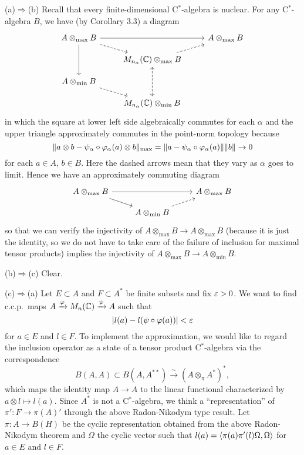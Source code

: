 \documentclass{../../../small}
\begin{document}
\begin{pf}
(a)$\Rightarrow$(b)
Recall that every finite-dimensional C$^*$-algebra is nuclear.
For any C$^*$-algebra $B$, we have (by Corollary 3.3) a diagram
\[\begin{tikzcd}[row sep=10pt]
 A\otimes_{\max} B \ar{rr}\ar[dashed]{rd}\ar{dd} &&  A\otimes_{\max} B\\
&M_{n_\alpha}(\C)\otimes_{\max} B \ar[dashed]{ru}\ar[dashed,leftrightarrow]{dd}&\\
 A\otimes_{\min} B \ar[dashed]{rd} &&\\
&M_{n_\alpha}(\C)\otimes_{\min} B&
\end{tikzcd}\]
in which the square at lower left side algebraically commutes for each $\alpha$ and the upper triangle approximately commutes in the point-norm topology because
\[\|a\otimes b-\psi_\alpha\circ\varphi_\alpha(a)\otimes b\|_{\max}=\|a-\psi_\alpha\circ\varphi_\alpha(a)\|\|b\|\to0\]
for each $a\in A$, $b\in B$.
Here the dashed arrows mean that they vary as $\alpha$ goes to limit.
Hence we have an approximately commuting diagram
\[\begin{tikzcd}[row sep=10pt]
 A\otimes_{\max} B \ar{rr}\ar{rd} &&  A\otimes_{\max} B\\
& A\otimes_{\min} B \ar[dashed]{ur}&
\end{tikzcd}\]
so that we can verify the injectivity of $A\otimes_{\max} B\to A\otimes_{\max} B$ (because it is just the identity, so we do not have to take care of the failure of inclusion for maximal tensor products) implies the injectivity of $A\otimes_{\max} B\to A\otimes_{\min} B$.

(b)$\Rightarrow$(c)
Clear.

(c)$\Rightarrow$(a)
Let $E\subset A$ and $F\subset A^*$ be finite subsets and fix $\varepsilon>0$.
We want to find c.c.p.~maps $A\xrightarrow{\varphi}M_n(\mathbb{C})\xrightarrow{\psi} A$ such that
\[|l(a)-l(\psi\circ\varphi(a))|<\varepsilon\]
for $a\in E$ and $l\in F$.
To implement the approximation, we would like to regard the inclusion operator as a state of a tensor product C$^*$-algebra via the correspondence
\[B(A, A)\subset B(A, A^{**})\xrightarrow{\sim}(A\otimes_\pi A^*)^*,\]
which maps the identity map $A\to A$ to the linear functional characterized by $a\otimes l\mapsto l(a)$.
Since $A^*$ is not a C$^*$-algebra, we think a ``representation'' of $\pi':F\to\pi(A)'$ through the above Radon-Nikodym type result.
Let $\pi:A\to B(H)$ be the cyclic representation obtained from the above Radon-Nikodym theorem and $\Omega$ the cyclic vector such that $l(a)=\langle\pi(a)\pi'(l)\Omega,\Omega\rangle$ for $a\in E$ and $l\in F$.


\end{pf}
\end{document}
